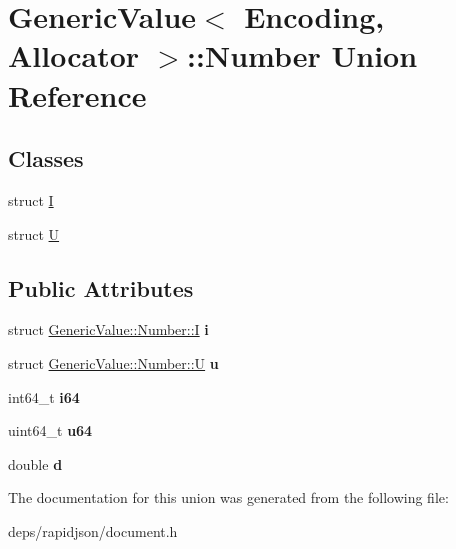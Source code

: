 \hypertarget{union_generic_value_1_1_number}{}\section{Generic\+Value$<$ Encoding, Allocator $>$\+:\+:Number Union Reference}
\label{union_generic_value_1_1_number}
\subsection*{Classes}
\begin{DoxyCompactItemize}
\item 
struct \hyperlink{struct_generic_value_1_1_number_1_1_i}{I}
\item 
struct \hyperlink{struct_generic_value_1_1_number_1_1_u}{U}
\end{DoxyCompactItemize}
\subsection*{Public Attributes}
\begin{DoxyCompactItemize}
\item 
struct \hyperlink{struct_generic_value_1_1_number_1_1_i}{Generic\+Value\+::\+Number\+::I} {\bfseries i}\hypertarget{union_generic_value_1_1_number_a0593fffc72a240979606668179e94436}{}\label{union_generic_value_1_1_number_a0593fffc72a240979606668179e94436}

\item 
struct \hyperlink{struct_generic_value_1_1_number_1_1_u}{Generic\+Value\+::\+Number\+::U} {\bfseries u}\hypertarget{union_generic_value_1_1_number_a3b5f0986718c830b88d641491248131d}{}\label{union_generic_value_1_1_number_a3b5f0986718c830b88d641491248131d}

\item 
int64\+\_\+t {\bfseries i64}\hypertarget{union_generic_value_1_1_number_ae53d96a8ead92099541da3b71633b77b}{}\label{union_generic_value_1_1_number_ae53d96a8ead92099541da3b71633b77b}

\item 
uint64\+\_\+t {\bfseries u64}\hypertarget{union_generic_value_1_1_number_a1c8d3c6d226cf74315e233b30b622430}{}\label{union_generic_value_1_1_number_a1c8d3c6d226cf74315e233b30b622430}

\item 
double {\bfseries d}\hypertarget{union_generic_value_1_1_number_a7ca3ad492fff303586d241eb0d17c242}{}\label{union_generic_value_1_1_number_a7ca3ad492fff303586d241eb0d17c242}

\end{DoxyCompactItemize}


The documentation for this union was generated from the following file\+:\begin{DoxyCompactItemize}
\item 
deps/rapidjson/document.\+h\end{DoxyCompactItemize}
